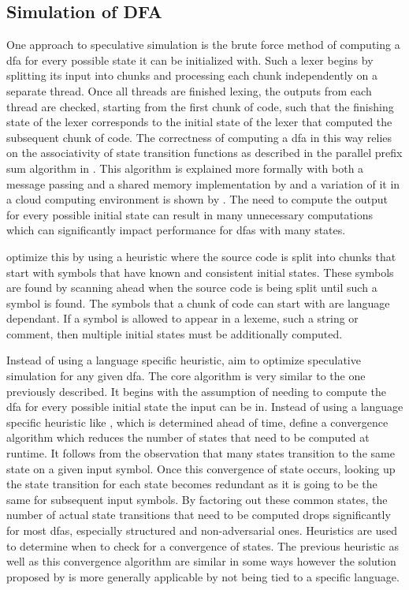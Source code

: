 \subsection{Simulation of DFA} \label{simulation_of_dfa}

One approach to speculative simulation is the brute force method of computing
a \gls{dfa} for every possible state it can be initialized with. Such a
lexer begins by splitting its input into chunks and processing each chunk
independently on a separate thread. Once all threads are finished lexing,
the outputs from each thread are checked, starting from the first chunk of
code, such that the finishing state of the lexer corresponds to the initial
state of the lexer that computed the subsequent chunk of code. The correctness
of computing a \gls{dfa} in this way relies on the  associativity of state
transition functions as described in the parallel prefix sum algorithm in
\cite{hillis_data_1986}. This algorithm is explained more formally with both a
message passing and a shared memory implementation by \cite{holub_parallel_2009}
and a variation of it in a cloud computing environment is shown by
\cite{ko_speculative_2012}. The need to compute the output for every possible
initial state can result in many unnecessary computations which can
significantly impact performance for \glspl{dfa} with many states.

\cite{barenghi_parallel_2015} optimize this by using a heuristic where the
source code is split into chunks that start with symbols that have known and
consistent initial states. These symbols are found by scanning ahead when the
source code is being split until such a symbol is found. The symbols that a
chunk of code can start with are language dependant. If a symbol is allowed to
appear in a lexeme, such a string or comment, then multiple initial states must
be additionally computed.

Instead of using a language specific heuristic,
\cite{mytkowicz_data-parallel_2014} aim to optimize speculative simulation for
any given \gls{dfa}. The core algorithm is very similar to the one previously
described. It begins with the assumption of needing to compute the \gls{dfa} for
every possible initial state the input can be in. Instead of using a language
specific heuristic like \cite{barenghi_parallel_2015}, which is determined ahead
of time, \cite{mytkowicz_data-parallel_2014} define a convergence algorithm
which reduces the number of states that need to be computed at runtime. It
follows from the observation that many states transition to the same state on
a given input symbol. Once this convergence of state occurs, looking up the
state transition for each state becomes redundant as it is going to be the same
for subsequent input symbols. By factoring out these common states, the number
of actual state transitions that need to be computed drops significantly for
most \gls{dfa}s, especially structured and non-adversarial ones. Heuristics
are used to determine when to check for a  convergence of states. The previous
heuristic as well as this convergence algorithm are similar in some ways however
the solution proposed by \cite{mytkowicz_data-parallel_2014} is more generally
applicable by not being tied to a specific language.

